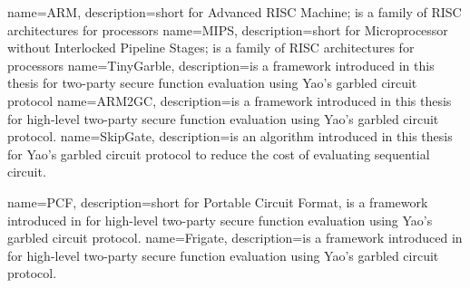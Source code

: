 {
  name=ARM,
  description={short for Advanced RISC Machine; is a family of RISC architectures for processors}
}
{
  name=MIPS,
  description={short for Microprocessor without Interlocked Pipeline Stages; is a family of RISC architectures for processors}
}
{
  name=TinyGarble,
  description={is a framework introduced in this thesis for two-party secure function evaluation using Yao's garbled circuit protocol}
}
{
  name=ARM2GC,
  description={is a framework introduced in this thesis for high-level two-party secure function evaluation using Yao's garbled circuit protocol.}
}
{
  name=SkipGate,
  description={is an algorithm introduced in this thesis for Yao's garbled circuit protocol to reduce the cost of evaluating sequential circuit.}
}

{
  name=PCF,
  description={short for Portable Circuit Format, is a framework introduced in \cite{kreuter2013pcf} for high-level two-party secure function evaluation using Yao's garbled circuit protocol.}
}
{
  name=Frigate,
  description={is a framework introduced in \cite{mood2016frigate} for high-level two-party secure function evaluation using Yao's garbled circuit protocol.}
}
